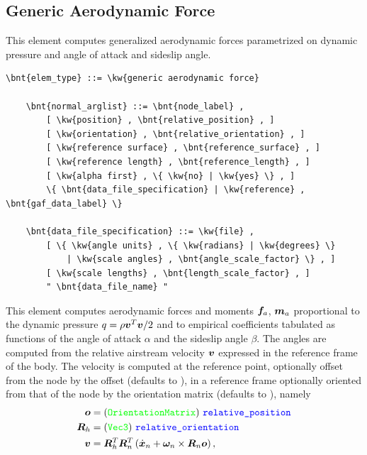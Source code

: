 \subsection{Generic Aerodynamic Force}
\label{sec:EL:AERO:GAF}
This element computes generalized aerodynamic forces parametrized
on dynamic pressure and angle of attack and sideslip angle.
\begin{Verbatim}[commandchars=\\\{\}]
    \bnt{elem_type} ::= \kw{generic aerodynamic force}

    \bnt{normal_arglist} ::= \bnt{node_label} ,
        [ \kw{position} , \bnt{relative_position} , ]
        [ \kw{orientation} , \bnt{relative_orientation} , ]
        [ \kw{reference surface} , \bnt{reference_surface} , ]
        [ \kw{reference length} , \bnt{reference_length} , ]
        [ \kw{alpha first} , \{ \kw{no} | \kw{yes} \} , ]
        \{ \bnt{data_file_specification} | \kw{reference} , \bnt{gaf_data_label} \}

    \bnt{data_file_specification} ::= \kw{file} , 
        [ \{ \kw{angle units} , \{ \kw{radians} | \kw{degrees} \}
            | \kw{scale angles} , \bnt{angle_scale_factor} \} , ]
        [ \kw{scale lengths} , \bnt{length_scale_factor} , ]
        " \bnt{data_file_name} "
\end{Verbatim}
This element computes aerodynamic forces and moments $\boldsymbol{f}_a$, $\boldsymbol{m}_a$
proportional to the dynamic pressure $q=\rho \boldsymbol{v}^T \boldsymbol{v}/2$
and to empirical coefficients tabulated as functions
of the angle of attack $\alpha$ and the sideslip angle $\beta$.
The angles are computed from the relative airstream velocity $\boldsymbol{v}$
expressed in the reference frame of the body.
The velocity is computed at the reference point, optionally offset
from the node  by the offset 
(defaults to ), in a reference frame optionally oriented
from that of the node  by the orientation matrix
 (defaults to ), namely
\begin{subequations}
\begin{align}
	\boldsymbol{o} &= (\textcolor{green}{\texttt{OrientationMatrix}})\ \textcolor{blue}{\texttt{relative\_position}}
	\\
	\boldsymbol{R}_h &= (\textcolor{green}{\texttt{Vec3}})\ \textcolor{blue}{\texttt{relative\_orientation}}
	\\
	\boldsymbol{v} &= \boldsymbol{R}_h^T \boldsymbol{R}_n^T \left( 
		\dot{\boldsymbol{x}}_n + \boldsymbol{\omega}_n \times \boldsymbol{R}_n \boldsymbol{o}
	 \right)
	,
\end{align}
\end{subequations}
